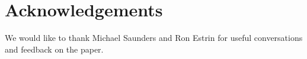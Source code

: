 \documentclass{article}
\begin{document}
\section*{Acknowledgements}

We would like to thank Michael Saunders and Ron Estrin for useful conversations and feedback on the paper.




\appendix

%
%
%
%
\end{document}

